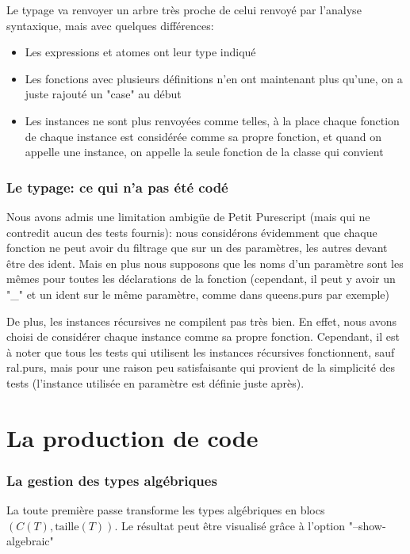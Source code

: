 \documentclass[12pt,a4paper,french]{article}
\begin{document}
Le typage va renvoyer un arbre très proche de celui renvoyé par l'analyse syntaxique, mais avec quelques différences:

\begin{itemize}
	\item Les expressions et atomes ont leur type indiqué
	\item Les fonctions avec plusieurs définitions n'en ont maintenant plus qu'une, on a juste rajouté un "case" au début
	\item Les instances ne sont plus renvoyées comme telles, à la place chaque fonction de chaque instance est considérée comme sa propre fonction, et quand on appelle une instance, on appelle la seule fonction de la classe qui convient
\end{itemize}


\section*{Le typage: ce qui n'a pas été codé}

Nous avons admis une limitation ambigüe de Petit Purescript (mais qui ne contredit aucun des tests fournis): nous considérons évidemment que chaque fonction ne peut avoir du filtrage
que sur un des paramètres, les autres devant être des ident. Mais en plus nous supposons que les noms d'un paramètre sont les mêmes pour toutes les déclarations de la fonction
(cependant, il peut y avoir un "\_" et un ident sur le même paramètre, comme dans queens.purs par exemple)

De plus, les instances récursives ne compilent pas très bien. En effet, nous avons choisi de considérer chaque instance comme sa propre fonction.
Cependant, il est à noter que tous les tests qui utilisent les instances récursives fonctionnent, sauf ral.purs, mais pour une raison peu satisfaisante
qui provient de la simplicité des tests (l'instance utilisée en paramètre est définie juste après).

\newpage
\part*{La production de code}

\section*{La gestion des types algébriques}
La toute première passe transforme les types algébriques en blocs $(C(T),\text{taille}(T))$. Le résultat peut être visualisé grâce à l'option "--show-algebraic"
\end{document}
